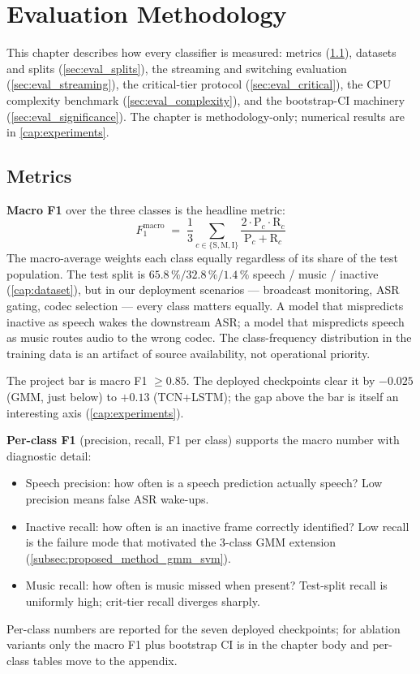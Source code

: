 \chapter{Evaluation Methodology}
\label{cap:evaluation}

This chapter describes how every classifier is measured: metrics (\cref{sec:eval_metrics}), datasets and splits (\cref{sec:eval_splits}), the streaming and switching evaluation (\cref{sec:eval_streaming}), the critical-tier protocol (\cref{sec:eval_critical}), the CPU complexity benchmark (\cref{sec:eval_complexity}), and the bootstrap-CI machinery (\cref{sec:eval_significance}).
The chapter is methodology-only; numerical results are in \cref{cap:experiments}.

\section{Metrics}
\label{sec:eval_metrics}

\textbf{Macro F1} over the three classes is the headline metric:
\begin{equation}
\label{eq:macro_f1}
F_1^{\text{macro}} \;=\; \frac{1}{3} \sum_{c \in \{\text{S}, \text{M}, \text{I}\}} \frac{2 \cdot \text{P}_c \cdot \text{R}_c}{\text{P}_c + \text{R}_c}
\end{equation}
The macro-average weights each class equally regardless of its share of the test population.
The test split is $65.8\,\% / 32.8\,\% / 1.4\,\%$ speech / music / inactive (\cref{cap:dataset}), but in our deployment scenarios — broadcast monitoring, ASR gating, codec selection — every class matters equally.
A model that mispredicts inactive as speech wakes the downstream ASR; a model that mispredicts speech as music routes audio to the wrong codec.
The class-frequency distribution in the training data is an artifact of source availability, not operational priority.

The project bar is macro F1 $\geq 0.85$.
The deployed checkpoints clear it by $-0.025$ (GMM, just below) to $+0.13$ (TCN+LSTM); the gap above the bar is itself an interesting axis (\cref{cap:experiments}).

\textbf{Per-class F1} (precision, recall, F1 per class) supports the macro number with diagnostic detail:
\begin{itemize}
    \item Speech precision: how often is a speech prediction actually speech? Low precision means false ASR wake-ups.
    \item Inactive recall: how often is an inactive frame correctly identified? Low recall is the failure mode that motivated the 3-class GMM extension (\cref{subsec:proposed_method_gmm_svm}).
    \item Music recall: how often is music missed when present? Test-split recall is uniformly high; crit-tier recall diverges sharply.
\end{itemize}
Per-class numbers are reported for the seven deployed checkpoints; for ablation variants only the macro F1 plus bootstrap CI is in the chapter body and per-class tables move to the appendix.

